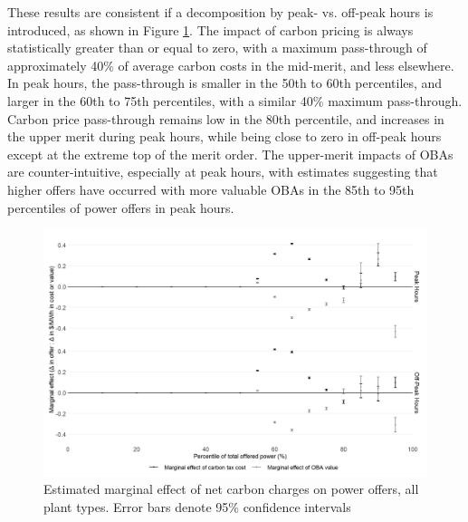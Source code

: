 \documentclass[12pt]{article}
\begin{document}
These results are consistent if a decomposition by peak- vs. off-peak hours is introduced, as shown in Figure \ref{fig:decomp_peaks}. The impact of carbon pricing is always statistically greater than or equal to zero, with a maximum pass-through of approximately 40\% of average carbon costs in the mid-merit, and less elsewhere. In peak hours, the pass-through is smaller in the 50th to 60th percentiles, and larger in the 60th to 75th percentiles, with a similar 40\% maximum pass-through. Carbon price pass-through remains low in the 80th percentile, and increases in the upper merit during peak hours, while being close to zero in off-peak hours except at the extreme top of the merit order. The upper-merit impacts of OBAs are counter-intuitive, especially at peak hours, with estimates suggesting that higher offers have occurred with more valuable OBAs in the 85th to 95th percentiles of power offers in peak hours.


\begin{figure}[!htb]
    \centering
     \includegraphics[width=.9\textwidth]{../images/all_plants.png}
    \caption{Estimated marginal effect of net carbon charges on power offers, all plant types. Error bars denote 95\% confidence intervals}
    \label{fig:decomp_peaks}
\end{figure}
\end{document}
